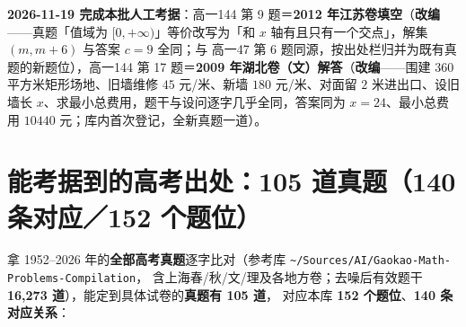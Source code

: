 \documentclass[a4paper,11pt]{article}
\begin{document}
\textbf{2026-11-19 完成本批人工考据}：高一144 第 9 题＝\textbf{2012 年江苏卷填空}（\textbf{改编}------真题「值域为 \([0,+\infty)\)」等价改写为「和 \(x\) 轴有且只有一个交点」，解集 \((m,m+6)\) 与答案 \(c=9\) 全同；与 高一47 第 6 题同源，按出处栏归并为既有真题的新题位），高一144 第 17 题＝\textbf{2009 年湖北卷（文）解答}（\textbf{改编}------围建 \(360\) 平方米矩形场地、旧墙维修 \(45\) 元/米、新墙 \(180\) 元/米、对面留 \(2\) 米进出口、设旧墙长 \(x\)、求最小总费用，题干与设问逐字几乎全同，答案同为 \(x=24\)、最小总费用 \(10440\) 元；库内首次登记，全新真题一道）。

\clearpage
\section{能考据到的高考出处：105 道真题（140 条对应／152 个题位）}

拿 1952--2026 年的\textbf{全部高考真题}逐字比对（参考库 \texttt{\textasciitilde{}/\allowbreak{}Sources/\allowbreak{}AI/\allowbreak{}Gaokao-\allowbreak{}Math-\allowbreak{}Problems-\allowbreak{}Compilation}，
含上海春/秋/文/理及各地方卷；去噪后有效题干 \textbf{16,273 道}），能定到具体试卷的\textbf{真题有 105 道}，
对应本库 \textbf{152 个题位}、\textbf{140 条对应关系}：
\end{document}
